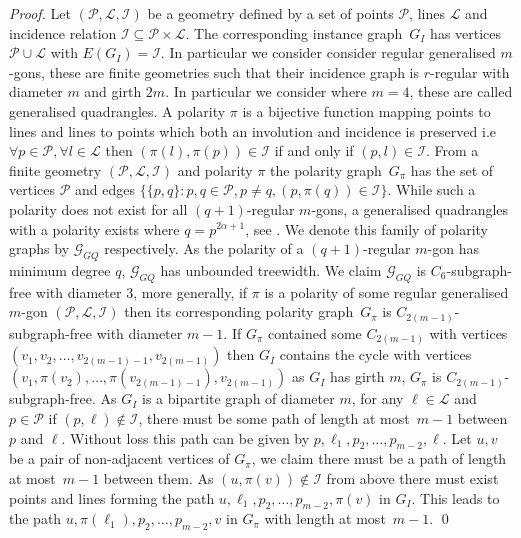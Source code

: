 \documentclass[runningheads,envcountsame]{llncs}
\begin{document}
\begin{proof}
	Let $(\mathcal{P}, \mathcal{L},\mathcal{I})$ be a geometry defined by a set of points $\mathcal{P}$, lines $\mathcal{L}$ and incidence relation $\mathcal{I} \subseteq \mathcal{P} \times \mathcal{L}$. The corresponding instance graph~$G_I$ has vertices $\mathcal{P} \cup \mathcal{L}$ with $E(G_I) = \mathcal{I}$. In particular we consider consider regular generalised $m$-gons, these are finite geometries such that their incidence graph is $r$-regular with diameter $m$ and girth $2m$. In particular we consider where $m=4$, these are called generalised quadrangles.
	A polarity $\pi$ is a bijective function mapping points to lines and lines to points which both an involution and incidence is preserved i.e $\forall p \in \mathcal{P}, \forall l \in \mathcal{L}$ then $(\pi(l), \pi(p)) \in \mathcal{I}$ if and only if  $(p,l) \in \mathcal{I}$. From a finite geometry $(\mathcal{P}, \mathcal{L},\mathcal{I})$ and polarity $\pi$ the polarity graph~$G_{\pi}$ has the set of vertices $\mathcal{P}$ and edges $\{\{p, q\} : p, q \in \mathcal{P}, p \neq q, (p, \pi(q)) \in \mathcal{I}\}$. While such a polarity does not exist for all $(q+1)$-regular $m$-gons, a generalised quadrangles with a polarity exists where $q=p^{2\alpha+1}$, see \cite{Carter89,Tits60}. We denote this family of polarity graphs by $\mathcal{G}_{GQ}$ respectively. As the polarity of a  $(q+1)$-regular $m$-gon has minimum degree $q$,  $\mathcal{G}_{GQ}$ has unbounded treewidth.
	We claim  $\mathcal{G}_{GQ}$ is  $C_{6}$-subgraph-free with diameter $3$, more generally, if $\pi$ is a polarity of some regular generalised $m$-gon $(\mathcal{P}, \mathcal{L},\mathcal{I})$ then its corresponding polarity graph~$G_{\pi}$ is $C_{2(m-1)}$-subgraph-free with diameter $m-1$. If $G_{\pi}$ contained some $C_{2(m-1)}$ with vertices $(v_1,v_2, \ldots, v_{2(m-1)-1}, v_{2(m-1)})$ then $G_I$ contains the cycle with vertices
    $(v_1,\pi(v_2), \ldots, \pi(v_{2(m-1)-1}), v_{2(m-1)})$ as  $G_I$ has girth $m$, $G_{\pi}$ is $C_{2(m-1)}$-subgraph-free.
     As $G_I$ is a bipartite graph of diameter $m$, for any $\ell \in \mathcal{L}$ and $p \in \mathcal{P}$ if $(p,\ell) \notin \mathcal{I}$, there must be some path of length at most~$m-1$ between $p$ and $\ell$. Without loss this path can be given by $p, \ell_1,p_2, \ldots, p_{m-2}, \ell$. Let $u,v$ be a pair of non-adjacent vertices of $G_{\pi}$, we claim there must be a path of length at most~$m-1$ between them. As $(u, \pi(v)) \notin \mathcal{I}$ from above there must exist points and lines forming the path $u, \ell_1,p_2, \ldots, p_{m-2}, \pi(v)$ in $G_I$. This leads to the path $u, \pi(\ell_1),p_2, \ldots, p_{m-2}, v$ in $G_{\pi}$ with length at most~$m-1$. \qed	
\end{proof}
\end{document}
